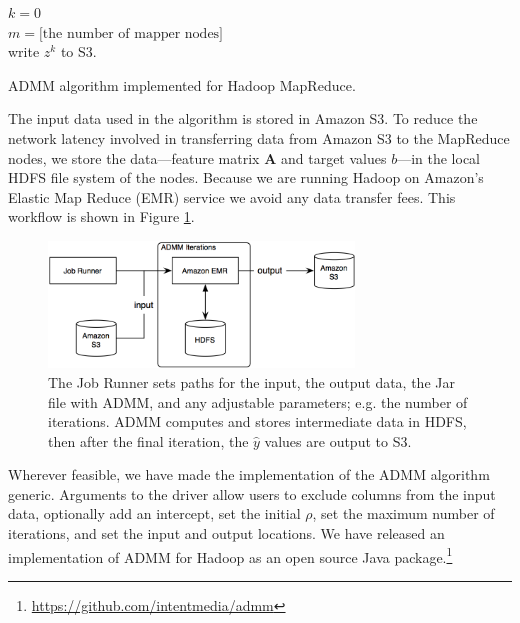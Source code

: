 \documentclass[10pt, conference, compsocconf]{IEEEtran}
\begin{document}
\begin{algorithm}
\SetAlgoLined
{}
$k=0$\\
$m=\text{[the number of mapper nodes]}$\\
write $z^k$ to S3.
\label{alg:admm}
\vspace{1em}
\caption{ADMM algorithm implemented for Hadoop MapReduce.}
\end{algorithm}

The input data used in the algorithm is stored in Amazon S3.  To reduce the network latency involved in transferring data from Amazon S3 to the MapReduce nodes, we store the data---feature matrix $\mathbf{A}$ and target values $b$---in the local HDFS file system of the nodes.  Because we are running Hadoop on Amazon's Elastic Map Reduce (EMR) service we avoid any data transfer fees.  This workflow is shown in Figure \ref{fig:workflow}.

\begin{figure}[!t]
\centering
\includegraphics[width=3.2in]{aws_implementation}
\caption{The Job Runner sets paths for the input, the output data, the Jar file with ADMM, and any adjustable parameters; e.g. the number of iterations.  ADMM computes and stores intermediate data in HDFS, then after the final iteration, the $\hat{y}$ values are output to S3.}
\label{fig:workflow}
\end{figure}

Wherever feasible, we have made the implementation of the ADMM algorithm generic.  Arguments to the driver allow users to exclude columns from the input data, optionally add an intercept, set the initial $\rho$, set the maximum number of iterations, and set the input and output locations. We have released an implementation of ADMM for Hadoop as an open source Java package.\footnote{\url{https://github.com/intentmedia/admm}}
\end{document}
